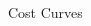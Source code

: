\documentclass[9pt]{beamer}
\begin{document}
\begin{frame}{Cost Curves}
\begin{columns}[c]
\begin{column}{0.5\textwidth}
    \end{column}
\end{columns}
\end{frame}
\end{document}

